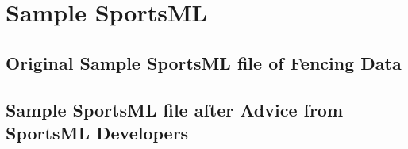 \chapter{Sample SportsML} \label{appendix-sample-fencing-sportsml}
\section{Original Sample SportsML file of Fencing Data} \label{sportsml-sample}

\section{Sample SportsML file after Advice from SportsML Developers}
\label{sportsml-sample-2}
